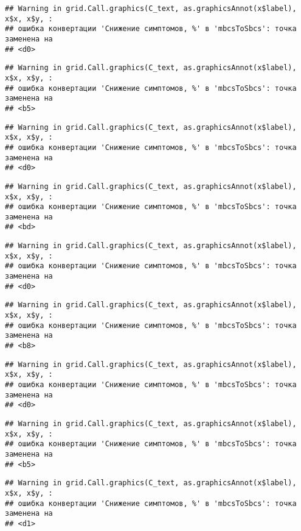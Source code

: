 \documentclass[
]{article}
\begin{document}
\begin{verbatim}
## Warning in grid.Call.graphics(C_text, as.graphicsAnnot(x$label), x$x, x$y, :
## ошибка конвертации 'Снижение симптомов, %' в 'mbcsToSbcs': точка заменена на
## <d0>
\end{verbatim}

\begin{verbatim}
## Warning in grid.Call.graphics(C_text, as.graphicsAnnot(x$label), x$x, x$y, :
## ошибка конвертации 'Снижение симптомов, %' в 'mbcsToSbcs': точка заменена на
## <b5>
\end{verbatim}

\begin{verbatim}
## Warning in grid.Call.graphics(C_text, as.graphicsAnnot(x$label), x$x, x$y, :
## ошибка конвертации 'Снижение симптомов, %' в 'mbcsToSbcs': точка заменена на
## <d0>
\end{verbatim}

\begin{verbatim}
## Warning in grid.Call.graphics(C_text, as.graphicsAnnot(x$label), x$x, x$y, :
## ошибка конвертации 'Снижение симптомов, %' в 'mbcsToSbcs': точка заменена на
## <bd>
\end{verbatim}

\begin{verbatim}
## Warning in grid.Call.graphics(C_text, as.graphicsAnnot(x$label), x$x, x$y, :
## ошибка конвертации 'Снижение симптомов, %' в 'mbcsToSbcs': точка заменена на
## <d0>
\end{verbatim}

\begin{verbatim}
## Warning in grid.Call.graphics(C_text, as.graphicsAnnot(x$label), x$x, x$y, :
## ошибка конвертации 'Снижение симптомов, %' в 'mbcsToSbcs': точка заменена на
## <b8>
\end{verbatim}

\begin{verbatim}
## Warning in grid.Call.graphics(C_text, as.graphicsAnnot(x$label), x$x, x$y, :
## ошибка конвертации 'Снижение симптомов, %' в 'mbcsToSbcs': точка заменена на
## <d0>
\end{verbatim}

\begin{verbatim}
## Warning in grid.Call.graphics(C_text, as.graphicsAnnot(x$label), x$x, x$y, :
## ошибка конвертации 'Снижение симптомов, %' в 'mbcsToSbcs': точка заменена на
## <b5>
\end{verbatim}

\begin{verbatim}
## Warning in grid.Call.graphics(C_text, as.graphicsAnnot(x$label), x$x, x$y, :
## ошибка конвертации 'Снижение симптомов, %' в 'mbcsToSbcs': точка заменена на
## <d1>
\end{verbatim}
\end{document}

